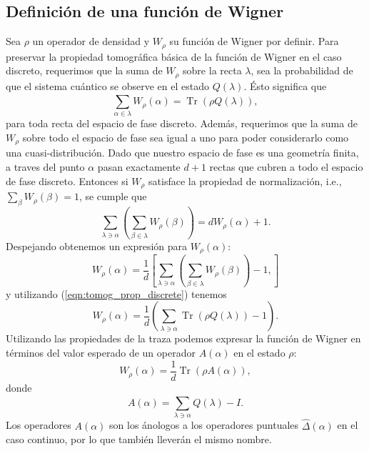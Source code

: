 \documentclass[a4paper]{report}
\DeclareMathOperator{\Tr}{Tr}
\begin{document}
  \subsection{Definición de una función de Wigner}

  Sea $\rho$ un operador de densidad y $W_\rho$ su función
  de Wigner por definir. Para preservar la propiedad
  tomográfica básica de la función de Wigner en el caso
  discreto, requerimos que la suma de $W_\rho$ sobre la
  recta $\lambda$, sea la probabilidad de que el sistema
  cuántico se observe en el estado $Q(\lambda)$. Ésto
  significa que 
  \begin{equation}
    \label{eqn:tomog_prop_discrete}
    \sum_{\alpha \in \lambda}^{} W_\rho(\alpha)
    = \Tr\left( \rho Q(\lambda) \right),
  \end{equation}
  para toda recta del espacio de fase discreto. Además,
  requerimos que la suma de $W_\rho$ sobre todo el espacio
  de fase sea igual a uno para poder considerarlo como una
  cuasi-distribución. Dado que nuestro espacio de fase es
  una geometría finita, a traves del punto $\alpha$ pasan
  exactamente $d+1$ rectas que cubren a todo el espacio de
  fase discreto.  Entonces si $W_\rho$ satisface la
  propiedad de normalización, i.e., $\sum_\beta
  W_\rho(\beta) = 1$, se cumple que
  \begin{equation}
    \sum_{\lambda \ni \alpha}^{}
    \left( \sum_{\beta \in \lambda}^{} W_\rho(\beta) \right) 
    = d W_\rho(\alpha) + 1.
  \end{equation}
  Despejando obtenemos un expresión para $W_\rho(\alpha)$:
  \[
    W_\rho(\alpha)
    = \frac{1}{d}
    \left[
      \sum_{\lambda \ni \alpha}^{}
      \left(
        \sum_{\beta \in \lambda}^{} W_\rho(\beta)
      \right) - 1,
    \right]
  \] 
  y utilizando (\ref{eqn:tomog_prop_discrete}) tenemos
  \begin{equation}
    W_\rho(\alpha)
    = \frac{1}{d} \left( \sum_{\lambda \ni \alpha}^{}
    \Tr\left( \rho Q(\lambda) \right) - 1 \right).
  \end{equation}
  Utilizando las propiedades de la traza podemos expresar
  la función de Wigner en términos del valor esperado de un
  operador $A(\alpha)$ en el estado $\rho$:
  \begin{equation}
    \label{eqn:discrete_wigner}
    W_\rho(\alpha)
    = \frac{1}{d} \Tr\left( \rho A(\alpha) \right),
  \end{equation} 
  donde 
  \begin{equation}
    \label{eqn:discrete_point_op}
    A(\alpha)
    = \sum_{\lambda \ni \alpha}^{} Q(\lambda) - I.
  \end{equation} 
  Los operadores $A(\alpha)$ son los ánologos a los
  operadores puntuales $\hat \Delta(\alpha)$ en el caso
  continuo, por lo que también lleverán el mismo nombre.
\end{document}
